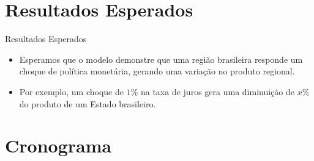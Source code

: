 \documentclass[10pt]{beamer}
\let\olditem\item
\renewcommand{\item}{%
	\olditem\vspace{5pt}}
\begin{document}
	
	
\section{Resultados Esperados}
	
	
\begin{frame}[fragile]{Resultados Esperados}
		
		\begin{itemize}
			\item Esperamos que o modelo demonstre que uma região brasileira responde um choque de política monetária, gerando uma variação no produto regional.
			\item Por exemplo, um choque de $1\%$ na taxa de juros gera uma diminuição de $x\%$ do produto de um Estado brasileiro.
		\end{itemize}
		
	\end{frame}
	
	
	\section{Cronograma}
	
	
\end{document}
